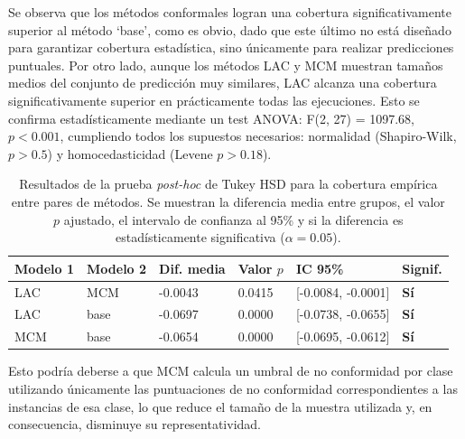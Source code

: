 Se observa que los métodos conformales logran una cobertura significativamente superior al método `base', como es obvio, dado que este último no está diseñado para garantizar cobertura estadística, sino únicamente para realizar predicciones puntuales.
Por otro lado, aunque los métodos LAC y MCM muestran tamaños medios del conjunto de predicción muy similares, LAC alcanza una cobertura significativamente superior en prácticamente todas las ejecuciones. Esto se confirma estadísticamente mediante un test ANOVA: F(2, 27) = 1097.68, $p < 0.001$, cumpliendo todos los supuestos necesarios: normalidad (Shapiro-Wilk, $p > 0.5$) y homocedasticidad (Levene $p > 0.18$).

\renewcommand{\arraystretch}{1.2}
\begin{table}[htbp]
    \small
    \centering
    \begin{tabular}{llllll}
    \toprule
    \textbf{Modelo 1} & \textbf{Modelo 2} & \textbf{Dif. media} & \textbf{Valor $p$} & \textbf{IC 95\%} & \textbf{Signif.} \\ \hline
    LAC & MCM & -0.0043 & 0.0415 & [-0.0084, -0.0001] & \textbf{Sí} \\
    LAC & base & -0.0697 & 0.0000 & [-0.0738, -0.0655] & \textbf{Sí} \\
    MCM & base & -0.0654 & 0.0000 & [-0.0695, -0.0612] & \textbf{Sí} \\
    \bottomrule
    \end{tabular}
    \caption[
        Resultados de la prueba \textit{post-hoc} de Tukey HSD para la cobertura empírica entre pares de métodos.
    ]{
        Resultados de la prueba \textit{post-hoc} de Tukey HSD para la cobertura empírica entre pares de métodos.
        Se muestran la diferencia media entre grupos, el valor $p$ ajustado, el intervalo de confianza al 95\% y si la diferencia es estadísticamente significativa ($\alpha = 0.05$).
    }
    \label{tab:AMM_tukey_EC}
\end{table}

Esto podría deberse a que MCM calcula un umbral de no conformidad por clase utilizando únicamente las puntuaciones de no conformidad correspondientes a las instancias de esa clase, lo que reduce el tamaño de la muestra utilizada y, en consecuencia, disminuye su representatividad. 

